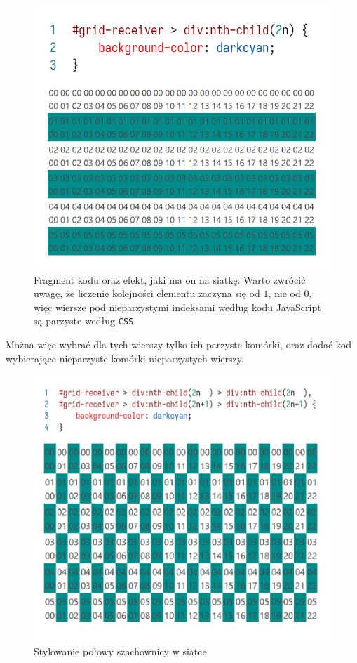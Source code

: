 \documentclass[licencjacka]{pracadypl}
\begin{document}
\begin{figure}[H]
  \centering
  \includegraphics[width=\linewidth/\real{1.6}]{images/codeui-row-coloring.png}
  \caption{Fragment kodu oraz efekt, jaki ma on na siatkę. Warto zwrócić uwagę, że liczenie kolejności elementu zaczyna się od $1$, nie od $0$, więc wiersze pod nieparzystymi indeksami według kodu JavaScript są parzyste według \texttt{CSS}}
  \label{fig:codeui-row-coloring}
\end{figure}

Można więc wybrać dla tych wierszy tylko ich parzyste komórki, oraz dodać kod wybierające nieparzyste komórki nieparzystych wierszy.

\begin{figure}[H]
  \centering
  \includegraphics[width=\linewidth/\real{1.6}]{images/codeui-checkerboard-half-coloring.png}
  \caption{Stylowanie połowy szachownicy w siatce}
  \label{fig:codeui-checkerboard-half-coloring}
\end{figure}
\end{document}

